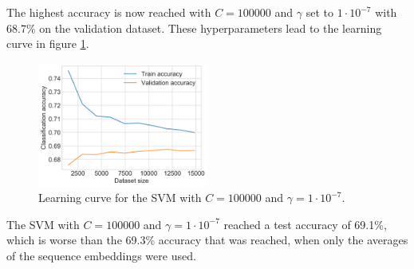 The highest accuracy is now reached with $C=100000$ and $\gamma$ set to $1\cdot10^{-7}$ with 68.7\% on the validation dataset.
These hyperparameters lead to the learning curve in figure \ref{figure:svm_learning_std}.
\begin{figure}[h]
    \centering
    \includegraphics[width=0.5\textwidth]{figures/charts/training_with_std/svm_learning_curve.png}
    \caption{Learning curve for the \ac{SVM} with $C=100000$ and $\gamma=1\cdot10^{-7}$.}
    \label{figure:svm_learning_std}
\end{figure}
The \ac{SVM} with $C=100000$ and $\gamma=1\cdot10^{-7}$ reached a test accuracy of 69.1\%, which is worse than the 69.3\% accuracy that was reached, when only the averages of the sequence embeddings were used.
\clearpage

